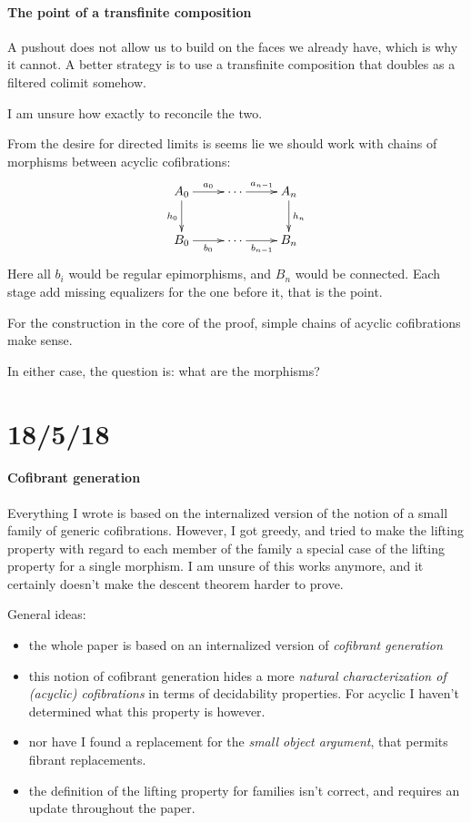 \documentclass[csh.tex]{subfiles}
\begin{document}
\paragraph{The point of a transfinite composition}
A pushout does not allow us to build on the faces we already have, which is why it cannot. A better strategy is to use a transfinite composition that doubles as a filtered colimit somehow.

I am unsure how exactly to reconcile the two.

From the desire for directed limits is seems lie we should work with chains of morphisms between acyclic cofibrations:
\[\xymatrix{
A_0 \ar[r]^{a_0}\ar[d]_{h_0} & \cdots\ar[r]^{a_{n-1}} & A_n\ar[d]^{h_n} \\
B_0 \ar[r]_{b_0} & \cdots \ar[r]_{b_{n-1}} & B_n 
}\]
Here all $b_i$ would be regular epimorphisms, and $B_n$ would be connected. Each stage add missing equalizers for the one before it, that is the point.

For the construction in the core of the proof, simple chains of acyclic cofibrations make sense.

In either case, the question is: what are the morphisms?



\section{18/5/18}

\paragraph{Cofibrant generation}
Everything I wrote is based on the internalized version of the notion of a small family of generic cofibrations. However, I got greedy, and tried to make the lifting property with regard to each member of the family a special case of the lifting property for a single morphism. I am unsure of this works anymore, and it certainly doesn't make the descent theorem harder to prove.

General ideas:
\begin{itemize}
\item the whole paper is based on an internalized version of \emph{cofibrant generation}
\item this notion of cofibrant generation hides a more \emph{natural characterization of (acyclic) cofibrations} in terms of decidability properties. For acyclic I haven't determined what this property is however.
\item nor have I found a replacement for the \emph{small object argument}, that permits fibrant replacements.
\item the definition of the lifting property for families isn't correct, and requires an update throughout the paper.
\end{itemize}
\end{document}

